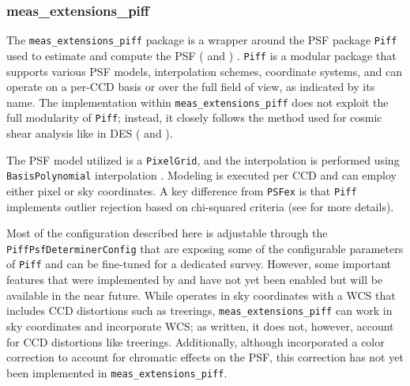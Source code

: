 \subsubsection{meas\_extensions\_piff}


The \texttt{meas\_extensions\_piff} package is a wrapper around the PSF package  \texttt{Piff} used to estimate 
and compute the PSF (\citealt{2021ascl.soft02024J} and \citealt{2021MNRAS.501.1282J}) .  \texttt{Piff} is a 
modular package that supports various PSF models, interpolation schemes, coordinate systems, and can operate on 
a per-CCD basis or over the full field of view, as indicated by its name. The implementation 
within  \texttt{meas\_extensions\_piff} does not exploit the full modularity of \texttt{Piff}; instead, it closely follows the 
method used for cosmic shear analysis like in DES (\citealt{2021MNRAS.501.1282J} and \citealt{2025OJAp....8E..26S}).

The PSF model utilized is a  \texttt{PixelGrid}, and the interpolation is performed using  \texttt{BasisPolynomial} interpolation \citep{2021MNRAS.501.1282J}. 
Modeling is executed per CCD and can employ either pixel or sky coordinates. A key difference from  \texttt{PSFex} is that  \texttt{Piff} 
implements outlier rejection based on chi-squared criteria (see \citealt{2021MNRAS.501.1282J}  for more details).

Most of the configuration described here is adjustable through the  \texttt{PiffPsfDeterminerConfig} that are exposing some 
of the configurable parameters of \texttt{Piff} and can be fine-tuned for a 
dedicated survey. However, some important features that were implemented by \cite{2021MNRAS.501.1282J}  and 
\cite{2025OJAp....8E..26S} have not yet been enabled but will be available in the near future. While \cite{2021MNRAS.501.1282J} 
operates in sky coordinates with a WCS that includes CCD distortions such as treerings,  \texttt{meas\_extensions\_piff} can 
work in sky coordinates and incorporate WCS; as written, it does not, however, account for CCD distortions like treerings. Additionally, 
although \citealt{2025OJAp....8E..26S} incorporated a color correction to account for chromatic effects on the PSF,
 this correction has not yet been implemented in  \texttt{meas\_extensions\_piff}.